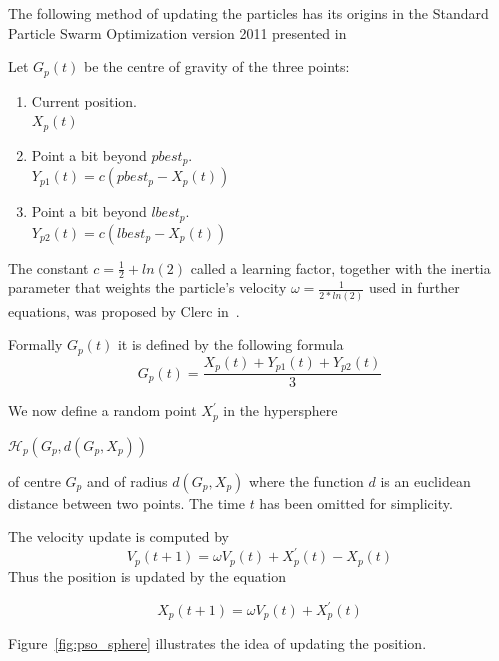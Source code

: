 \documentclass{mini}
\begin{document}
The following method of updating the particles has its origins in the Standard Particle Swarm Optimization version 2011 presented in~\cite{pso_11}

Let $G_p(t)$ be the centre of gravity of the three points:
\begin{enumerate}
    \item Current position. \\
    $X_p(t)$
    
    \item Point a bit beyond $pbest_p$. \\
    $Y_{p1}(t) = c(pbest_p-X_p(t))$
    
    \item Point a bit beyond $lbest_p$. \\
    $Y_{p2}(t) = c(lbest_p-X_p(t))$
    
\end{enumerate}

The constant $c = \frac{1}{2} + ln(2)$ called a learning factor, together with the inertia parameter that weights the particle's velocity $\omega = \frac{1}{2 * ln(2)}$ used in further equations, was proposed by Clerc in~\cite{pso_anal}.

Formally $G_p(t)$ it is defined by the following formula 
\begin{equation}
    G_p(t) = \frac{X_p(t) + Y_{p1}(t) + Y_{p2}(t)} {3}
\end{equation}

We now define a random point $X^{'}_p$ in the hypersphere
\begin{center}
    $\mathcal{H}_p(G_p, d(G_p, X_p))$ 
\end{center}
of centre $G_p$ and of radius $d(G_p, X_p)$ where the function $d$ is an euclidean distance between two points. The time $t$ has been omitted for simplicity.

The velocity update is computed by
\begin{equation}
    V_p(t+1) = \omega  V_p(t) + X^{'}_p(t) - X_p(t)
\end{equation}
Thus the position is updated by the equation

\begin{equation}
    X_p(t+1) = \omega  V_p(t) + X^{'}_p(t)
\end{equation}

Figure~\ref{fig:pso_sphere} illustrates the idea of updating the position.
\end{document}

